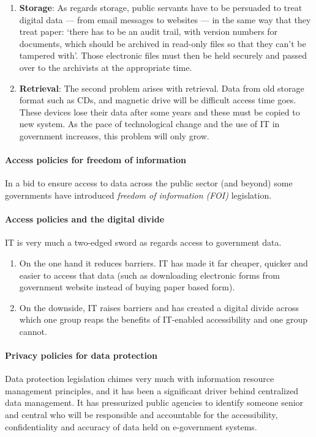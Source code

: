 \begin{enumerate}
	\item \textbf{Storage}:
	As regards storage, public servants have to	be persuaded to treat digital data — from email messages to websites — in the same	way that they treat paper: `there has to be an audit trail, with version numbers for documents, which should be archived in read-only files so that they can't be tampered with'. Those electronic files must then be held securely and passed over to the archivists at the appropriate time.
	

\item \textbf{Retrieval}:
The second problem arises with retrieval. Data from old storage format such as CDs, and magnetic drive will be difficult access time goes. These devices lose their data after some years and these must be copied to new system. As the pace of technological change and the use of IT in government increases, this problem will only grow.

\end{enumerate}
\paragraph*{Access policies for freedom of information}
In a bid to ensure access to data across the public sector (and beyond) some governments have introduced \textit{freedom of information (FOI)} legislation.

\paragraph*{Access policies and the digital divide}
IT is very much a two-edged sword as regards access to government data. 

\begin{enumerate}
	\item On the one hand it reduces barriers. IT has made it far cheaper, quicker and easier to access that data (such as downloading electronic forms from government website instead of buying paper based form). 
	\item On the downside, IT raises barriers and has created a digital divide across which one group reaps the benefits of IT-enabled accessibility and one group cannot.
\end{enumerate}

\paragraph*{Privacy policies for data protection}
Data protection legislation chimes very much with information resource management principles, and it has been a significant driver behind centralized data management. It has pressurized public agencies to identify someone senior and central who will be responsible and accountable for the accessibility, confidentiality and accuracy of data held on e-government systems.

